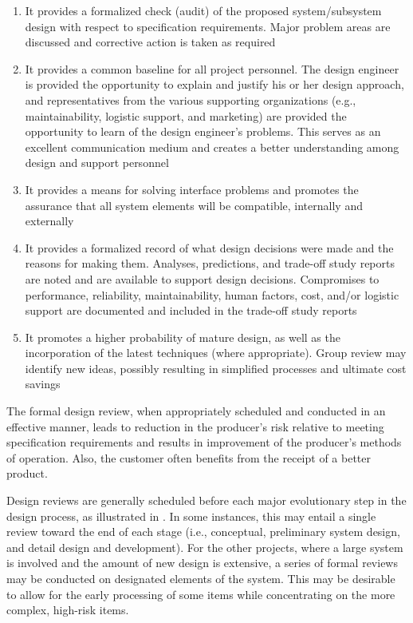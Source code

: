 \begin{enumerate}
\item It provides a formalized check (audit) of the proposed system/subsystem design with respect to specification requirements. Major problem areas are discussed and corrective action is taken as required
\item It provides a common baseline for all project personnel. The design engineer is provided the opportunity to explain and justify his or her design approach, and representatives from the various supporting organizations (e.g., maintainability, logistic support, and marketing) are provided the opportunity to learn of the design engineer’s problems. This serves as an excellent communication medium and creates a better understanding among design and support personnel
\item It provides a means for solving interface problems and promotes the assurance that all system elements will be compatible, internally and externally
\item It provides a formalized record of what design decisions were made and the reasons for making them. Analyses, predictions, and trade-off study reports are noted and are available to support design decisions. Compromises to performance, reliability, maintainability, human factors, cost, and/or logistic support are documented and included in the trade-off study reports
\item It promotes a higher probability of mature design, as well as the incorporation of the latest techniques (where appropriate). Group review may identify new ideas, possibly resulting in simplified processes and ultimate cost savings
\end{enumerate}

The formal design review, when appropriately scheduled and conducted in an effective manner, leads to reduction in the producer’s risk relative to meeting specification requirements and results in improvement of the producer’s methods of operation. Also, the customer often benefits from the receipt of a better product.

Design reviews are generally scheduled before each major evolutionary step in the design process, as illustrated in . In some instances, this may entail a single review toward the end of each stage (i.e., conceptual, preliminary system design, and detail design and development). For the other projects, where a large system is involved and the amount of new design is extensive, a series of formal reviews may be conducted on designated elements of the system. This may be desirable to allow for the early processing of some items while concentrating on the more complex, high-risk items.

